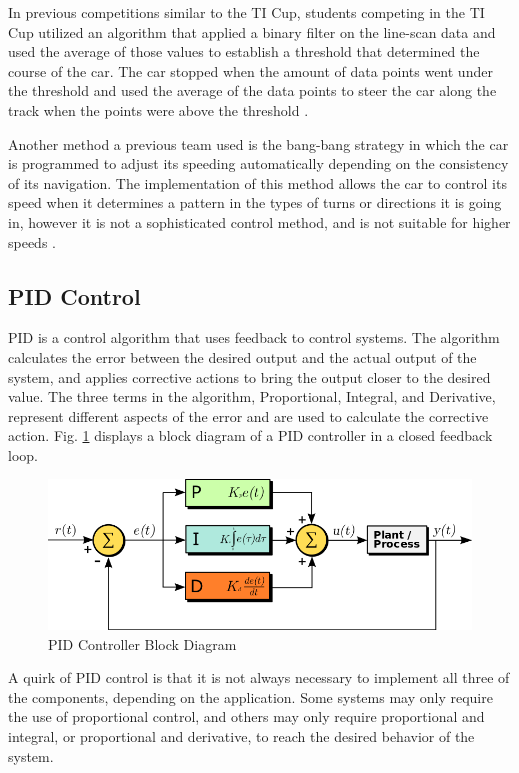 \documentclass{article}
\begin{document}
In previous competitions similar to the TI Cup, students competing in the TI Cup utilized an algorithm that applied a binary filter on the line-scan data and used the average of those values to establish a threshold that determined the course of the car. The car stopped when the amount of data points went under the threshold and used the average of the data points to steer the car along the track when the points were above the threshold \cite{HarrisonPaper}. 

Another method a previous team used is the bang-bang strategy in which the car is programmed to adjust its speeding automatically depending on the consistency of its navigation. The implementation of this method allows the car to control its speed when it determines a pattern in the types of turns or directions it is going in, however it is not a sophisticated control method, and is not suitable for higher speeds \cite{DantePaper}.

\subsection{PID Control}
PID is a control algorithm that uses feedback to control systems. The algorithm calculates the error between the desired output and the actual output of the system, and applies corrective actions to bring the output closer to the desired value. The three terms in the algorithm, Proportional, Integral, and Derivative, represent different aspects of the error and are used to calculate the corrective action. Fig. \ref{fig-pidBlockDiagram} displays a block diagram of a PID controller in a closed feedback loop. 

\begin{figure}[htbp]
    \centering
    \includegraphics[width=\linewidth, keepaspectratio]{figs/pidAttempt3.png}
    \caption{PID Controller Block Diagram \cite{pidDiagram}}
    \label{fig-pidBlockDiagram}
\end{figure}

A quirk of PID control is that it is not always necessary to implement all three of the components, depending on the application. Some systems may only require the use of proportional control, and others may only require proportional and integral, or proportional and derivative, to reach the desired behavior of the system.
\end{document}
